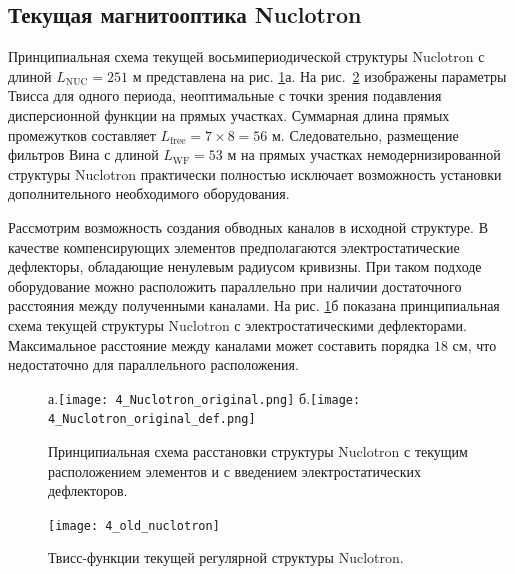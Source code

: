 	\subsection{Текущая магнитооптика Nuclotron}\label{sec:EDM/optics}
\par Принципиальная схема текущей восьмипериодической структуры Nuclotron с длиной $L_{\text{NUC}}=251$ м представлена на рис. \ref{fig:4_Nuclotron_original}а. На рис.~\ref{fig:4_old_nuclotron} изображены параметры Твисса для одного периода, неоптимальные с точки зрения подавления дисперсионной функции на прямых участках. Суммарная длина прямых промежутков составляет $L_{\text{free}} = 7\times8=56$ м. Следовательно, размещение фильтров Вина с длиной $L_{\text{WF}} = 53$ м на прямых участках немодернизированной структуры Nuclotron практически полностью исключает возможность установки дополнительного необходимого оборудования. 

\par Рассмотрим возможность создания обводных каналов в исходной структуре. В качестве компенсирующих элементов предполагаются электростатические дефлекторы, обладающие ненулевым радиусом кривизны. При таком подходе оборудование можно расположить параллельно при наличии достаточного расстояния между полученными каналами. На рис. \ref{fig:4_Nuclotron_original}б показана принципиальная схема текущей структуры Nuclotron с электростатическими дефлекторами. Максимальное расстояние между каналами может составить порядка $18$ см, что недостаточно для параллельного расположения.

\begin{figure}[!h]
	\centering
	а.\texttt{[image: 4\_Nuclotron\_original.png]}
	б.\texttt{[image: 4\_Nuclotron\_original\_def.png]}
	\caption{Принципиальная схема расстановки структуры Nuclotron с текущим расположением элементов и с введением электростатических дефлекторов.}
	\label{fig:4_Nuclotron_original}
\end{figure}

\begin{figure}[!h]
  \centering
	\texttt{[image: 4\_old\_nuclotron]}
   \caption{Твисс-функции текущей регулярной структуры Nuclotron.}
   \label{fig:4_old_nuclotron}
\end{figure}

